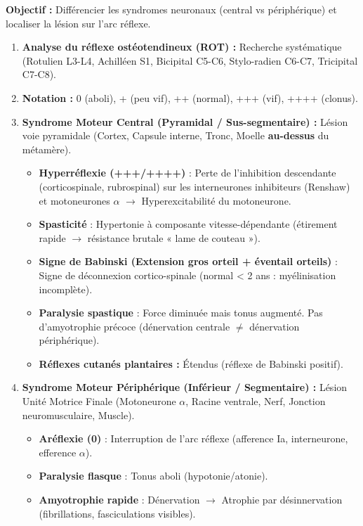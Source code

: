 \documentclass[11pt]{article}
\begin{document}
\begin{methode}
\textbf{Objectif :} Différencier les syndromes neuronaux (central vs périphérique) et localiser la lésion sur l'arc réflexe.
\begin{enumerate}
    \item \textbf{Analyse du réflexe ostéotendineux (ROT) :} Recherche systématique (Rotulien L3-L4, Achilléen S1, Bicipital C5-C6, Stylo-radien C6-C7, Tricipital C7-C8).
    \item \textbf{Notation :} 0 (aboli), + (peu vif), ++ (normal), +++ (vif), ++++ (clonus).
    \item \textbf{Syndrome Moteur Central (Pyramidal / Sus-segmentaire) :} Lésion voie pyramidale (Cortex, Capsule interne, Tronc, Moelle \textbf{au-dessus} du métamère).
    \begin{itemize}
        \item \textbf{Hyperréflexie (+++/++++)} : Perte de l'inhibition descendante (corticospinale, rubrospinal) sur les interneurones inhibiteurs (Renshaw) et motoneurones $\alpha$ $\rightarrow$ Hyperexcitabilité du motoneurone.
        \item \textbf{Spasticité} : Hypertonie à composante vitesse-dépendante (étirement rapide $\rightarrow$ résistance brutale « lame de couteau »).
        \item \textbf{Signe de Babinski (Extension gros orteil + éventail orteils)} : Signe de déconnexion cortico-spinale (normal < 2 ans : myélinisation incomplète).
        \item \textbf{Paralysie spastique} : Force diminuée mais tonus augmenté. Pas d'amyotrophie précoce (dénervation centrale $\neq$ dénervation périphérique).
        \item \textbf{Réflexes cutanés plantaires :} Étendus (réflexe de Babinski positif).
    \end{itemize}
    \item \textbf{Syndrome Moteur Périphérique (Inférieur / Segmentaire) :} Lésion Unité Motrice Finale (Motoneurone $\alpha$, Racine ventrale, Nerf, Jonction neuromusculaire, Muscle).
    \begin{itemize}
        \item \textbf{Aréflexie (0)} : Interruption de l'arc réflexe (afference Ia, interneurone, efference $\alpha$).
        \item \textbf{Paralysie flasque} : Tonus aboli (hypotonie/atonie).
        \item \textbf{Amyotrophie rapide} : Dénervation $\rightarrow$ Atrophie par désinnervation (fibrillations, fasciculations visibles).

\end{itemize}
\end{enumerate}
\end{methode}
\end{document}
